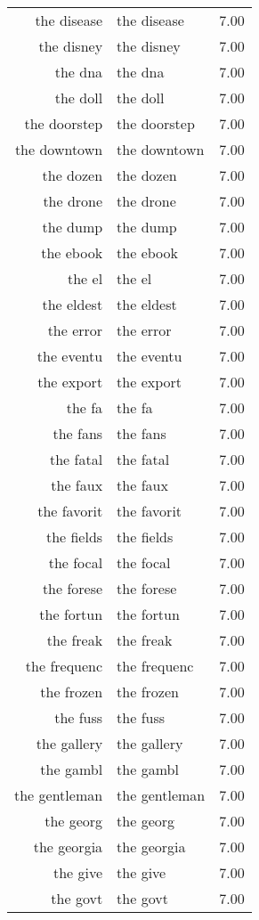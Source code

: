 \begin{table}[ht]
\begin{tabular}{rlr}
  the disease & the disease & 7.00 \\ 
  the disney & the disney & 7.00 \\ 
  the dna & the dna & 7.00 \\ 
  the doll & the doll & 7.00 \\ 
  the doorstep & the doorstep & 7.00 \\ 
  the downtown & the downtown & 7.00 \\ 
  the dozen & the dozen & 7.00 \\ 
  the drone & the drone & 7.00 \\ 
  the dump & the dump & 7.00 \\ 
  the ebook & the ebook & 7.00 \\ 
  the el & the el & 7.00 \\ 
  the eldest & the eldest & 7.00 \\ 
  the error & the error & 7.00 \\ 
  the eventu & the eventu & 7.00 \\ 
  the export & the export & 7.00 \\ 
  the fa & the fa & 7.00 \\ 
  the fans & the fans & 7.00 \\ 
  the fatal & the fatal & 7.00 \\ 
  the faux & the faux & 7.00 \\ 
  the favorit & the favorit & 7.00 \\ 
  the fields & the fields & 7.00 \\ 
  the focal & the focal & 7.00 \\ 
  the forese & the forese & 7.00 \\ 
  the fortun & the fortun & 7.00 \\ 
  the freak & the freak & 7.00 \\ 
  the frequenc & the frequenc & 7.00 \\ 
  the frozen & the frozen & 7.00 \\ 
  the fuss & the fuss & 7.00 \\ 
  the gallery & the gallery & 7.00 \\ 
  the gambl & the gambl & 7.00 \\ 
  the gentleman & the gentleman & 7.00 \\ 
  the georg & the georg & 7.00 \\ 
  the georgia & the georgia & 7.00 \\ 
  the give & the give & 7.00 \\ 
  the govt & the govt & 7.00 \\ 

\end{tabular}
\end{table}
